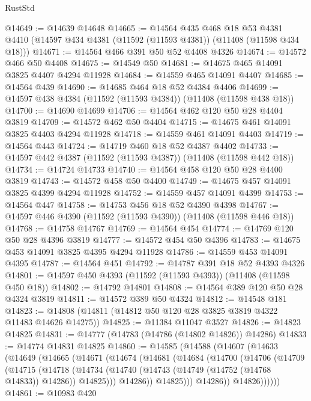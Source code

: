\begin{lexlean}{RustStd}
\begin{coremodule}
@14649 := @14639 @14648
@14665 := @14564
    @435
    @468
    @18
    @53
    @4381
    @4410
    (@14597 @434 @4381 (@11592 (@11593 @4381)) (@11408 (@11598 @434 @18)))
@14671 := @14564 @466 @391 @50 @52 @4408 @4326
@14674 := @14572 @466 @50 @4408
@14675 := @14549 @50
@14681 := @14675 @465 @14091 @3825 @4407 @4294 @11928
@14684 := @14559 @465 @14091 @4407
@14685 := @14564 @439
@14690 := @14685 @464 @18 @52 @4384 @4406
@14699 := @14597 @438 @4384 (@11592 (@11593 @4384)) (@11408 (@11598 @438 @18))
@14700 := @14690 @14699
@14706 := @14564 @462 @120 @50 @28 @4404 @3819
@14709 := @14572 @462 @50 @4404
@14715 := @14675 @461 @14091 @3825 @4403 @4294 @11928
@14718 := @14559 @461 @14091 @4403
@14719 := @14564 @443
@14724 := @14719 @460 @18 @52 @4387 @4402
@14733 := @14597 @442 @4387 (@11592 (@11593 @4387)) (@11408 (@11598 @442 @18))
@14734 := @14724 @14733
@14740 := @14564 @458 @120 @50 @28 @4400 @3819
@14743 := @14572 @458 @50 @4400
@14749 := @14675 @457 @14091 @3825 @4399 @4294 @11928
@14752 := @14559 @457 @14091 @4399
@14753 := @14564 @447
@14758 := @14753 @456 @18 @52 @4390 @4398
@14767 := @14597 @446 @4390 (@11592 (@11593 @4390)) (@11408 (@11598 @446 @18))
@14768 := @14758 @14767
@14769 := @14564 @454
@14774 := @14769 @120 @50 @28 @4396 @3819
@14777 := @14572 @454 @50 @4396
@14783 := @14675 @453 @14091 @3825 @4395 @4294 @11928
@14786 := @14559 @453 @14091 @4395
@14787 := @14564 @451
@14792 := @14787 @391 @18 @52 @4393 @4326
@14801 := @14597 @450 @4393 (@11592 (@11593 @4393)) (@11408 (@11598 @450 @18))
@14802 := @14792 @14801
@14808 := @14564 @389 @120 @50 @28 @4324 @3819
@14811 := @14572 @389 @50 @4324
@14812 := @14548 @181
@14823 := @14808 (@14811 (@14812 @50 @120 @28 @3825 @3819 @4322 @11483 @14626 @14275))
@14825 := @11384 @11047 @3527
@14826 := @14823 @14825
@14831 := @14777 (@14783 (@14786 (@14802 @14826)) @14286)
@14833 := @14774 @14831 @14825
@14860 := @14585
    (@14588
      (@14607
        (@14633
          (@14649
            (@14665
              (@14671
                (@14674
                  (@14681
                    (@14684
                      (@14700
                        (@14706
                          (@14709
                            (@14715
                              (@14718
                                (@14734
                                  (@14740
                                    (@14743 (@14749 (@14752 (@14768 @14833)) @14286))
                                    @14825)))
                              @14286))
                          @14825)))
                    @14286))
                @14826))))))
@14861 := @10983 @420

\end{coremodule}
\end{lexlean}
